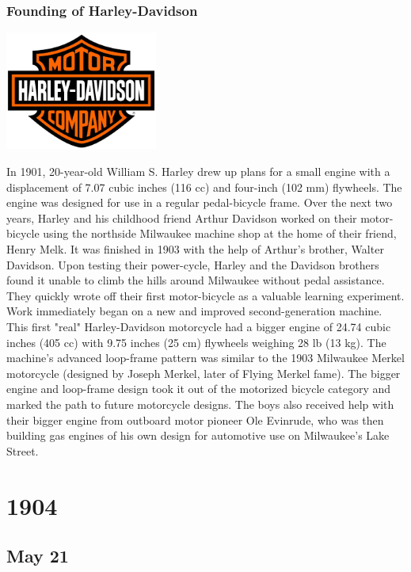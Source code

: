 \documentclass[11pt]{report}
\begin{document}
\subsection{Founding of Harley-Davidson}
\vspace{2mm}\begin{center}\includegraphics[width=5cm]{./img/harleyDavidsonLogo.jpg}\end{center}
In 1901, 20-year-old William S. Harley drew up plans for a small engine with a displacement of 7.07 cubic inches (116 cc) and four-inch (102 mm) flywheels. The engine was designed for use in a regular pedal-bicycle frame. Over the next two years, Harley and his childhood friend Arthur Davidson worked on their motor-bicycle using the northside Milwaukee machine shop at the home of their friend, Henry Melk. It was finished in 1903 with the help of Arthur's brother, Walter Davidson. Upon testing their power-cycle, Harley and the Davidson brothers found it unable to climb the hills around Milwaukee without pedal assistance. They quickly wrote off their first motor-bicycle as a valuable learning experiment.\\ \indent Work immediately began on a new and improved second-generation machine. This first "real" Harley-Davidson motorcycle had a bigger engine of 24.74 cubic inches (405 cc) with 9.75 inches (25 cm) flywheels weighing 28 lb (13 kg). The machine's advanced loop-frame pattern was similar to the 1903 Milwaukee Merkel motorcycle (designed by Joseph Merkel, later of Flying Merkel fame). The bigger engine and loop-frame design took it out of the motorized bicycle category and marked the path to future motorcycle designs. The boys also received help with their bigger engine from outboard motor pioneer Ole Evinrude, who was then building gas engines of his own design for automotive use on Milwaukee's Lake Street.

\chapter{1904}
\section{May 21}
\end{document}
